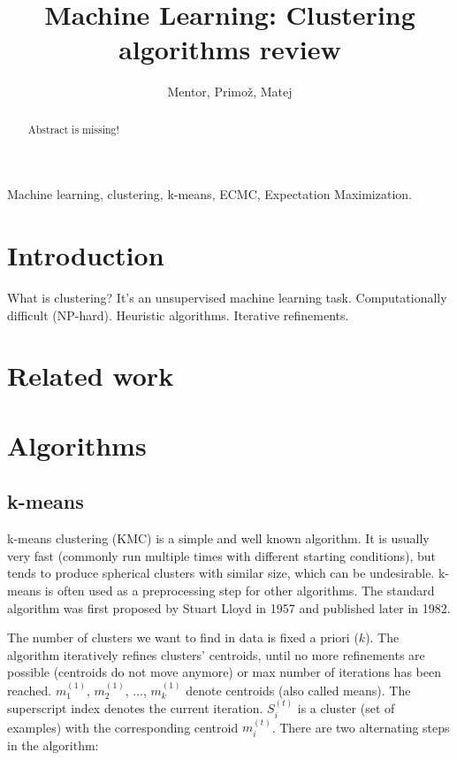 \documentclass[]{IEEEphot}
\begin{document}
\title{Machine Learning: Clustering algorithms review}
\author{Mentor, Primož, Matej}
\maketitle

\begin{abstract}
Abstract is missing!
\end{abstract}

\begin{IEEEkeywords}
Machine learning, clustering, k-means, ECMC, Expectation Maximization.
\end{IEEEkeywords}

\section{Introduction}
What is clustering? It's an unsupervised machine learning task. Computationally difficult
(NP-hard). Heuristic algorithms. Iterative refinements.

\section{Related work}

\newpage
\section{Algorithms}
\subsection{k-means}
k-means clustering (KMC) is a simple and well known algorithm. It is usually very
fast (commonly run multiple times with different starting conditions), but tends
to produce spherical clusters with similar size, which can be undesirable.
k-means is often used as a preprocessing step for other algorithms. The standard
algorithm was first proposed by Stuart Lloyd in 1957 and published later in 1982.

The number of clusters we want to find in data is fixed a priori ($k$).
The algorithm iteratively refines clusters' centroids,
until no more refinements are possible (centroids do not move anymore)
or max number of iterations has been reached. $m_1^{(1)}$, $m_2^{(1)}$, ..., $m_k^{(1)}$
denote centroids (also called means). The superscript index denotes the current iteration.
$S_i^{(t)}$ is a cluster (set of examples) with the corresponding centroid $m_i^{(t)}$.
There are two alternating steps in the algorithm:
\end{document}
